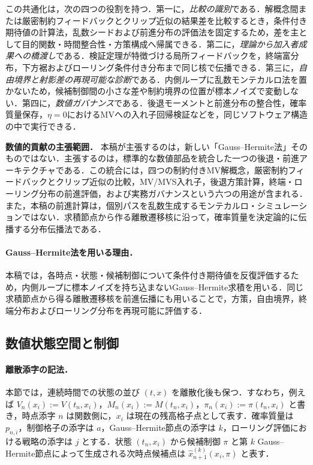 \documentclass[10pt,a4paper]{article}
\theoremstyle{plain}
\theoremstyle{definition}
\begin{document}
この共通化は，次の四つの役割を持つ．第一に，\emph{比較の識別}である．解概念間または厳密制約フィードバックとクリップ近似の結果差を比較するとき，条件付き期待値の計算法，乱数シードおよび前進分布の評価法を固定するため，差を主として目的関数・時間整合性・方策構成へ帰属できる．第二に，\emph{理論から加入者成果への橋渡し}である．検証定理が特徴づける局所フィードバックを，終端富分布，下方裾およびローリング条件付き分布まで同じ核で伝播できる．第三に，\emph{自由境界と射影差の再現可能な診断}である．内側ループに乱数モンテカルロ法を置かないため，候補制御間の小さな差や制約境界の位置が標本ノイズで変動しない．第四に，\emph{数値ガバナンス}である．後退モーメントと前進分布の整合性，確率質量保存，$\eta=0$におけるMVへの入れ子回帰検証などを，同じソフトウェア構造の中で実行できる．

\noindent\textbf{数値的貢献の主張範囲．}
本稿が主張するのは，新しい「Gauss--Hermite法」そのものではない．主張するのは，標準的な数値部品を統合した一つの後退・前進アーキテクチャである．この統合には，四つの制約付きMV解概念，厳密制約フィードバックとクリップ近似の比較，MV/MVS入れ子，後退方策計算，終端・ローリング分布の前進評価，および実務ガバナンスという六つの用途が含まれる．また，本稿の前進計算は，個別パスを乱数生成するモンテカルロ・シミュレーションではない．求積節点から作る離散遷移核に沿って，確率質量を決定論的に伝播する分布伝播法である．

\paragraph{Gauss--Hermite法を用いる理由．}
本稿では，各時点・状態・候補制御について条件付き期待値を反復評価するため，内側ループに標本ノイズを持ち込まないGauss--Hermite求積を用いる．同じ求積節点から得る離散遷移核を前進伝播にも用いることで，方策，自由境界，終端分布およびローリング分布を再現可能に評価する．

\subsection{数値状態空間と制御}
\label{sec:grid}

\paragraph{離散添字の記法．}
本節では，連続時間での状態の並び $(t,x)$ を離散化後も保つ．すなわち，例えば $V_n(x_i):=V(t_n,x_i)$，$M_n(x_i):=M(t_n,x_i)$，$\pi_n(x_i):=\pi(t_n,x_i)$ と書き，時点添字 $n$ は関数側に，$x_i$ は現在の残高格子点として表す．確率質量は $p_{n,i}$，制御格子の添字は $a$，Gauss--Hermite節点の添字は $k$，ローリング評価における戦略の添字は $j$ とする．状態 $(t_n,x_i)$ から候補制御 $\pi$ と第 $k$ Gauss--Hermite節点によって生成される次時点候補点は $\widehat{x}_{n+1}^{(k)}(x_i,\pi)$ と表す．
\end{document}
